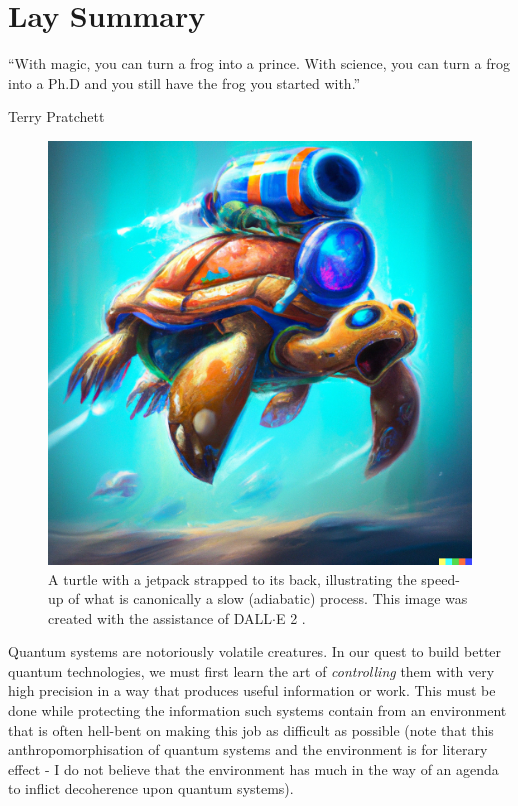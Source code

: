 \chapter{Lay Summary}
\epigraph{“With magic, you can turn a frog into a prince. With science, you can turn a frog into a Ph.D and you still have the frog you started with.”}{Terry Pratchett}

\begin{figure}
\centering
\includegraphics[width=0.9\linewidth]{images_v1/COLD_turle.png} \caption[DALL$\cdot$E turtle illustration.]{A turtle with a jetpack strapped to its back, illustrating the speed-up of what is canonically a slow (adiabatic) process. This image was created with the assistance of DALL$\cdot$E 2 \cite{noauthor_dalle_nodate}.}\label{fig:COLD_TURTLE}
\end{figure}

Quantum systems are notoriously volatile creatures. In our quest to build better quantum technologies, we must first learn the art of \emph{controlling} them with very high precision in a way that produces useful information or work. This must be done while protecting the information such systems contain from an environment that is often hell-bent on making this job as difficult as possible (note that this anthropomorphisation of quantum systems and the environment is for literary effect - I do not believe that the environment has much in the way of an agenda to inflict decoherence upon quantum systems).


